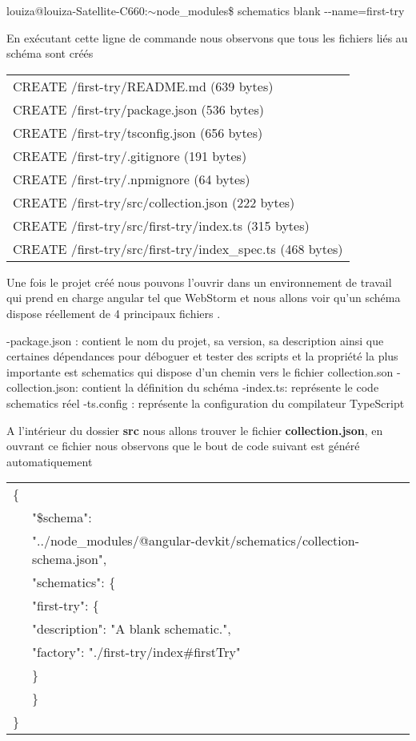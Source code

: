 \documentclass[12pt,french]{article}
\begin{document}
	\qquad louiza@louiza-Satellite-C660:$\sim$node\_modules\$ schematics blank \--\--name=first-try\newline
	
	En exécutant cette ligne de commande nous observons que tous les fichiers liés au schéma sont créés\newline
	
	\begin{tabular}{l}
		\qquad CREATE /first-try/README.md (639 bytes)\\
		\qquad CREATE /first-try/package.json (536 bytes)\\
		\qquad CREATE /first-try/tsconfig.json (656 bytes)\\
		\qquad CREATE /first-try/.gitignore (191 bytes)\\
		\qquad CREATE /first-try/.npmignore (64 bytes)\\
		\qquad CREATE /first-try/src/collection.json (222 bytes)\\
		\qquad CREATE /first-try/src/first-try/index.ts (315 bytes)\\
		\qquad CREATE /first-try/src/first-try/index\_spec.ts (468 bytes)
	\end{tabular}\break

	 Une fois le projet créé nous pouvons l’ouvrir dans un environnement de travail qui prend en charge angular tel que WebStorm et nous allons voir qu’un schéma dispose réellement de 4 principaux fichiers .\newline

	-package.json : contient le nom du projet, sa version, sa description ainsi que certaines dépendances pour déboguer et tester des scripts et la propriété la plus importante est schematics qui dispose d’un chemin vers le fichier collection.son\smallbreak
	-collection.json: contient la définition du schéma\smallbreak
	-index.ts: représente le code schematics réel\smallbreak
	-ts.config : représente la configuration du compilateur TypeScript\newline
	
	A l'intérieur du dossier \textbf{src} nous allons trouver le fichier \textbf{collection.json}, en ouvrant ce fichier nous observons que le bout de code suivant est généré automatiquement\newline
	
	\begin{tabular}{ll}
		\{&\\
		&"\$schema":\\ &"../node\_modules/@angular-devkit/schematics/collection-schema.json",\\
		&"schematics": \{\\
		&\quad"first-try": \{
\\
		&\qquad"description": "A blank schematic.",
\\
		&\qquad"factory": "./first-try/index\#firstTry"\\
		&\quad \}
\\
		& \}
\\
		\}
	\end{tabular}\break
\end{document}
